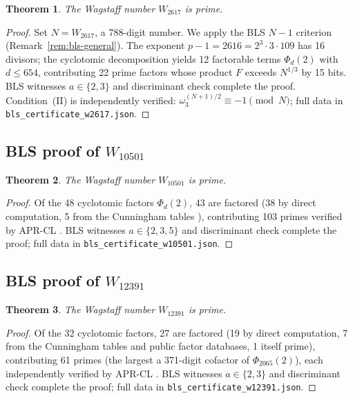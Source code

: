 \documentclass[12pt]{article}
\theoremstyle{plain}
\newtheorem{theorem}{Theorem}[section]
\theoremstyle{definition}
\theoremstyle{remark}
\begin{document}
\begin{theorem}\label{thm:W2617}
The Wagstaff number \(W_{2617}\) is prime.
\end{theorem}

\begin{proof}
Set \(N = W_{2617}\), a 788-digit number. We apply the BLS
\(N-1\) criterion \cite{ref3} (Remark~\ref{rem:bls-general}).
The exponent \(p - 1 = 2616 = 2^3 \cdot 3 \cdot 109\) has 16
divisors; the cyclotomic decomposition yields 12 factorable terms
\(\Phi_d(2)\) with \(d \leq 654\), contributing 22 prime factors
whose product \(F\) exceeds \(N^{1/3}\) by 15 bits. BLS witnesses
\(a \in \{2, 3\}\) and discriminant check complete the proof.
Condition~(II) is independently verified:
\(\omega_3^{(N+1)/2} \equiv -1 \pmod{N}\); full data in
\texttt{bls\_certificate\_w2617.json}.
\end{proof}

\subsection{BLS proof of \texorpdfstring{\(W_{10501}\)}{W\_10501}}

\begin{theorem}\label{thm:W10501}
The Wagstaff number \(W_{10501}\) is prime.
\end{theorem}

\begin{proof}
Of the 48 cyclotomic factors \(\Phi_d(2)\), 43 are factored
(38 by direct computation, 5 from the Cunningham tables
\cite{ref4}), contributing 103 primes verified by APR-CL
\cite{ref6}. BLS witnesses \(a \in \{2, 3, 5\}\) and
discriminant check complete the proof; full data in
\texttt{bls\_certificate\_w10501.json}.
\end{proof}

\subsection{BLS proof of \texorpdfstring{\(W_{12391}\)}{W\_12391}}

\begin{theorem}\label{thm:W12391}
The Wagstaff number \(W_{12391}\) is prime.
\end{theorem}

\begin{proof}
Of the 32 cyclotomic factors, 27 are factored (19 by direct
computation, 7 from the Cunningham tables \cite{ref4} and
public factor databases, 1 itself prime), contributing 61 primes
(the largest a 371-digit cofactor of \(\Phi_{2065}(2)\)), each
independently verified by APR-CL \cite{ref6}. BLS witnesses \(a \in \{2, 3\}\) and discriminant
check complete the proof; full data in
\texttt{bls\_certificate\_w12391.json}.
\end{proof}
\end{document}
